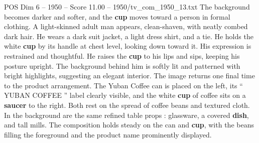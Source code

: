 \begin{textsample}{POS Dim 6 – 1950 – Score 11.00 – 1950/tv\_com\_1950\_13.txt}
The background becomes darker and softer, and the \textbf{cup} moves toward a person in formal clothing.
A light-skinned adult man appears, clean-shaven, with neatly combed dark hair.
He wears a dark suit jacket, a light dress shirt, and a tie.
He holds the white \textbf{cup} by its handle at chest level, looking down toward it.
His expression is restrained and thoughtful.
He raises the \textbf{cup} to his lips and sips, keeping his posture upright.
The background behind him is softly lit and patterned with bright highlights, suggesting an elegant interior.
The image returns one final time to the product arrangement.
The Yuban Coffee can is placed on the left, its “ YUBAN COFFEE ” label clearly visible, and the white \textbf{cup} of coffee sits on a \textbf{saucer} to the right.
Both rest on the spread of coffee beans and textured cloth.
In the background are the same refined table props : glassware, a covered \textbf{dish}, and tall mills.
The composition holds steady on the can and \textbf{cup}, with the beans filling the foreground and the product name prominently displayed.

\end{textsample}
